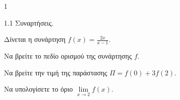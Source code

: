 \begin{ylh}{1}
	\item 1.1 Συναρτήσεις.
\end{ylh}
Δίνεται η συνάρτηση $f(x) = \frac{2x}{x-1}$.
\begin{alist}
	\item Να βρείτε το πεδίο ορισμού της συνάρτησης $f$. 
	\item Να βρείτε την τιμή της παράστασης $\Pi = f(0)+3f(2)$. 
	\item Να υπολογίσετε το όριο $\lim\limits_{x\to2} f(x)$. 
\end{alist}

